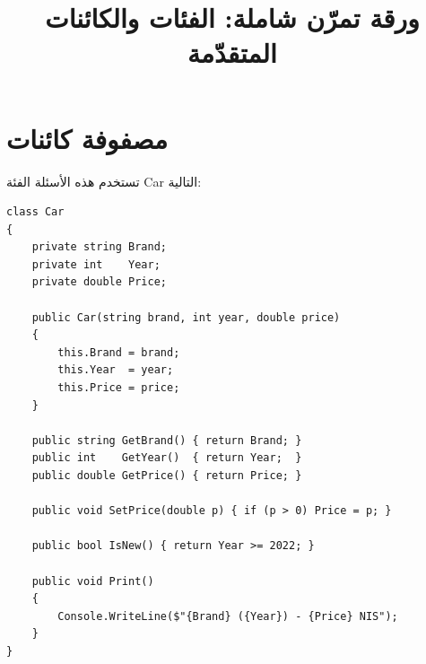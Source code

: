 \documentclass[14pt]{extarticle}
\title{ورقة تمرّن شاملة: الفئات والكائنات المتقدّمة}
\begin{document}
\maketitle
\thispagestyle{fancy}

\section{مصفوفة كائنات}

تستخدم هذه الأسئلة الفئة \textenglish{Car} التالية:

\begin{boxExample}
\begin{english}
{\small
\begin{verbatim}
class Car
{
    private string Brand;
    private int    Year;
    private double Price;

    public Car(string brand, int year, double price)
    {
        this.Brand = brand;
        this.Year  = year;
        this.Price = price;
    }

    public string GetBrand() { return Brand; }
    public int    GetYear()  { return Year;  }
    public double GetPrice() { return Price; }

    public void SetPrice(double p) { if (p > 0) Price = p; }

    public bool IsNew() { return Year >= 2022; }

    public void Print()
    {
        Console.WriteLine($"{Brand} ({Year}) - {Price} NIS");
    }
}
\end{verbatim}
}
\end{english}
\end{boxExample}
\end{document}
